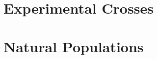 







\part{Experimental Crosses}
\label{part:exchangeable}







\part{Natural Populations}
\label{part:nonexchangeable}

% 








